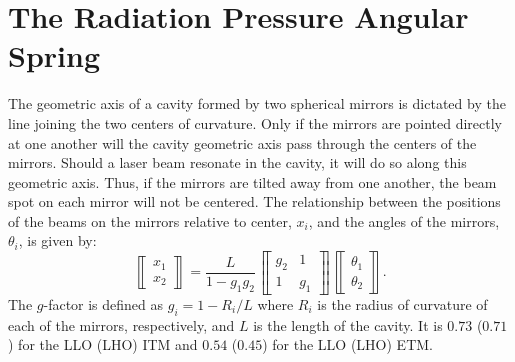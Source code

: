 \section{The Radiation Pressure Angular Spring}
The geometric axis of a cavity formed by two spherical mirrors is
dictated by the line joining the two centers of curvature. Only if the
mirrors are pointed directly at one another will the cavity geometric
axis pass through the centers of the mirrors. Should a laser beam
resonate in the cavity, it will do so along this geometric axis. Thus,
if the mirrors are tilted away from one another, the beam spot on each
mirror will not be centered. The relationship between the positions of
the beams on the mirrors relative to center, $x_i$, and the angles of
the mirrors, $\theta_i$, is given by:
\begin{equation}
\left\llbracket \begin{array}{c}
x_1\\
x_2 \end{array} \right\rrbracket = \frac{L}{1-g_1 g_2}
\left\llbracket \begin{array}{cc}
g_2 & 1\\
1 & g_1\end{array} \right\rrbracket
\left\llbracket \begin{array}{c}
\theta_1\\
\theta_2 \end{array} \right\rrbracket .
\label{eq:x}
\end{equation}
The $g$-factor is defined as $g_i=1-R_i/L$ where $R_i$ is the radius of
curvature of each of the mirrors, respectively, and $L$ is the length
of the cavity. It is $0.73$ ($0.71$) for the LLO (LHO) ITM and $0.54$
($0.45$) for the LLO (LHO) ETM. 

